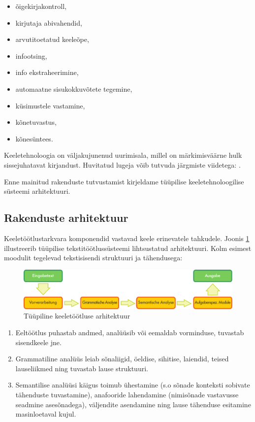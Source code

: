 \documentclass[]{../metanetpaper}
\begin{document}
\begin{multicols}{2}
       \begin{itemize}
      \item õigekirjakontroll,
      \item kirjutaja abivahendid,
      \item arvutitoetatud keeleõpe,
      \item infootsing,
      \item info ekstraheerimine,
      \item automaatne sisukokkuvõtete tege\-mine,
      \item küsimustele vastamine,
      \item kõnetuvastus,
      \item kõnesüntees.
    \end{itemize}


Keeletehnoloogia on väljakujunenud uurimisala, millel on märkimisväärne hulk sissejuhatavat kirjandust. Huvitatud lugeja võib tutvuda järgmiste viidetega:  \cite{carstensen-etal1, jurafsky-martin01, manning-schuetze1, lt-world1, lt-survey1}.

Enne mainitud rakenduste tutvustamist kirjeldame tüüpilise keeletehnoloogilise süsteemi arhitektuuri. 


\subsection{Rakenduste arhitektuur}

Keeletöötlustarkvara komponendid vastavad keele erinevatele tahkudele. 
Joonis \ref{fig:textprocessingarch_ee} illustreerib tüüpilise tekstitöötlussüsteemi lihtsustatud arhitektuuri. 
Kolm esimest moodulit tegelevad tekstisisendi struktuuri ja tähendusega:

\begin{figure}[htb]
  \center
  \includegraphics[width=\textwidth]{../_media/german/text_processing_app_architecture}
  \caption{Tüüpiline keeletöötluse arhitektuur}
  \label{fig:textprocessingarch_ee}
\end{figure}

\begin{enumerate}
      \item Eeltöötlus puhastab andmed, ana\-lüüsib või eemaldab vorminduse, tuvastab sisendkeele  jne.
      \item Grammatiline analüüs leiab sõna\-liigid, öeldise, sihitise, laiendid, teised lauseliikmed ning tuvastab lause struktuuri.
      \item Semantilise analüüsi käigus toimub ühestamine (s.o sõnade konteksti sobivate tähenduste tuvastamine), anafooride lahendamine (nimisõnade vastavusse seadmine asesõnadega), väljendite asendamine ning lause tähenduse esitamine masinloetaval kujul.
\end{enumerate}


\end{multicols}
\end{document}
